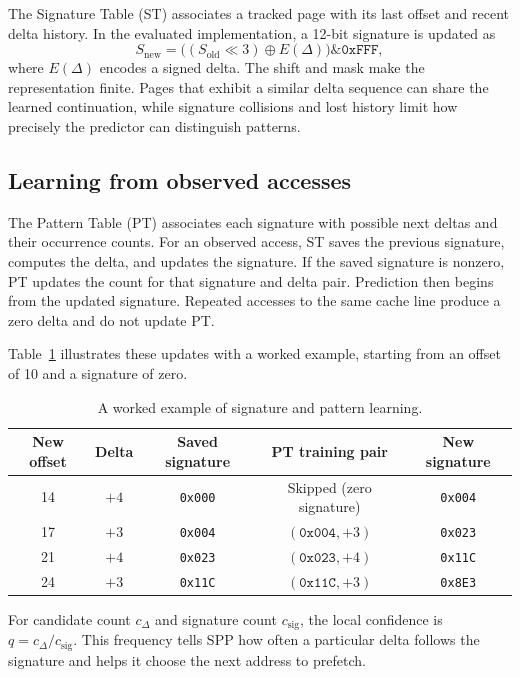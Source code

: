 \documentclass[a4paper,11pt]{article}
\newcommand{\code}[1]{\texttt{#1}}
\begin{document}
The Signature Table (ST) associates a tracked page with its last offset and recent delta history. In the evaluated implementation, a 12-bit signature is updated as
\[
S_{\mathrm{new}}=\bigl((S_{\mathrm{old}}\ll3)\oplus E(\Delta)\bigr)\mathbin{\&}\code{0xFFF},
\]
where $E(\Delta)$ encodes a signed delta. The shift and mask make the representation finite. Pages that exhibit a similar delta sequence can share the learned continuation, while signature collisions and lost history limit how precisely the predictor can distinguish patterns.

\subsection{Learning from observed accesses}
The Pattern Table (PT) associates each signature with possible next deltas and their occurrence counts. For an observed access, ST saves the previous signature, computes the delta, and updates the signature. If the saved signature is nonzero, PT updates the count for that signature and delta pair. Prediction then begins from the updated signature. Repeated accesses to the same cache line produce a zero delta and do not update PT.

Table~\ref{tab:learning} illustrates these updates with a worked example, starting from an offset of 10 and a signature of zero.
\begin{table}[htbp]
\centering
\caption{A worked example of signature and pattern learning.}\label{tab:learning}
\begin{tabular}{@{}ccccc@{}}
\toprule
New offset & Delta & Saved signature & PT training pair & New signature\\
\midrule
14 & $+4$ & \code{0x000} & Skipped (zero signature) & \code{0x004}\\
17 & $+3$ & \code{0x004} & $(\code{0x004},+3)$ & \code{0x023}\\
21 & $+4$ & \code{0x023} & $(\code{0x023},+4)$ & \code{0x11C}\\
24 & $+3$ & \code{0x11C} & $(\code{0x11C},+3)$ & \code{0x8E3}\\
\bottomrule
\end{tabular}
\end{table}

For candidate count $c_\Delta$ and signature count $c_{\mathrm{sig}}$, the local confidence is $q=c_\Delta/c_{\mathrm{sig}}$. This frequency tells SPP how often a particular delta follows the signature and helps it choose the next address to prefetch.
\end{document}

